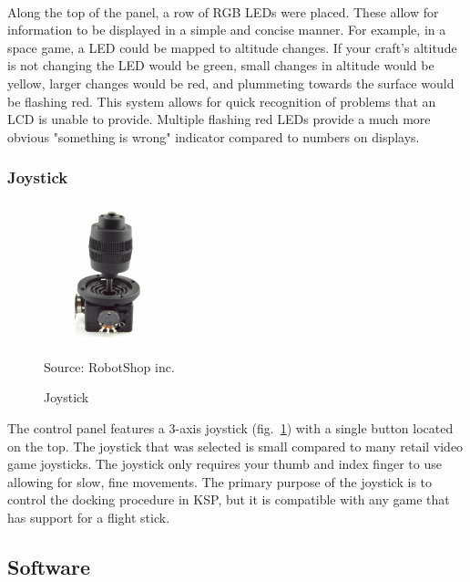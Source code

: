 \documentclass[12pt,a4paper]{article}
\newcommand{\source}[1]{\vspace{-0.6cm}\caption*{Source: {#1}} }
\begin{document}
\paragraph{}
Along the top of the panel, a row of \gls{RGB} \glspl{LED} were placed. These allow for information to be displayed in a simple and concise manner. For example, in a space game, a \gls{LED} could be mapped to altitude changes. If your craft's altitude is not changing the \gls{LED} would be green, small changes in altitude would be yellow, larger changes would be red, and plummeting towards the surface would be flashing red. This system allows for quick recognition of problems that an \gls{LCD} is unable to provide. Multiple flashing red \glspl{LED} provide a much more obvious "something is wrong" indicator compared to numbers on displays.
\subsubsection{Joystick}
\paragraph{}
\begin{figure}
	\vspace*{-1.5cm}
	\centering
	\includegraphics[width=0.35\textwidth]{joystick}
	\caption{Joystick}
	\source{RobotShop inc.}
	\label{fig:joystick}
\end{figure}
The control panel features a 3-axis joystick (fig.~\ref{fig:joystick}) with a single button located on the top. The joystick that was selected is small compared to many retail video game joysticks. The joystick only requires your thumb and index finger to use allowing for slow, fine movements. The primary purpose of the joystick is to control the docking procedure in \gls{KSP}, but it is compatible with any game that has support for a flight stick.
\subsection{Software}
\end{document}
